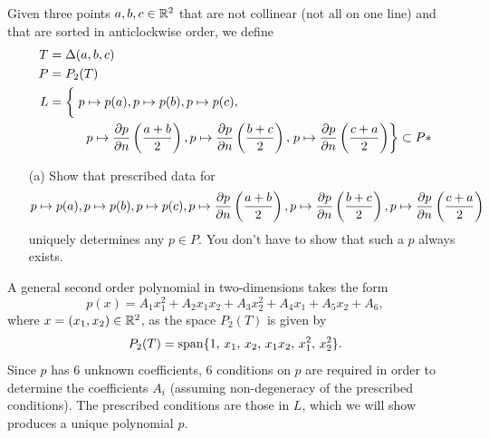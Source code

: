 




\begin{titlingpage}
	\titleGM
\end{titlingpage}
\clearpage
\setcounter{page}{1}

\begin{problem}{1}
Given three points $a,b,c \in \mathbb{R}^2$ that are not collinear (not all on one line) and that are sorted in anticlockwise order, we define
%
\begin{align*}
T &= \Delta (a,b,c) \\
P &= P_2(T) \\
L &= \left\{ \vphantom{\pd{p}{n}\left(\frac{a+b}{2}\right)} \right.
p \mapsto p(a),
p \mapsto p(b),
p \mapsto p(c), \\
&\qquad\quad
p \mapsto \pd{p}{n}\left(\frac{a+b}{2}\right),
p \mapsto \pd{p}{n}\left(\frac{b+c}{2}\right),
\left. p \mapsto \pd{p}{n}\left(\frac{c+a}{2}\right) \right\}
\subset P*
\end{align*}

\begin{center}
\end{center}

\begin{itemize}
	\item[(a)]  Show that prescribed data for
	$$p \mapsto p(a),
	p \mapsto p(b),
	p \mapsto p(c),
	p \mapsto \frac{\partial p}{\partial n}\left(\frac{a+b}{2}\right),
	p \mapsto \frac{\partial p}{\partial n}\left(\frac{b+c}{2}\right),
	p \mapsto \frac{\partial p}{\partial n}\left(\frac{c+a}{2}\right)$$
	uniquely determines any $p \in P$. You don't have to show that such a $p$ always exists.

\end{itemize}

\begin{solution}
A general second order polynomial in two-dimensions takes the form
\begin{equation}\label{QuadInterpPoly}
p(x) = A_1 x_1^2 + A_2 x_1x_2 + A_3 x_2^2 + A_4 x_1 + A_5 x_2 + A_6,
\end{equation}
where $x = (x_1,x_2) \in \mathbb{R}^2$, as the space $P_2(T)$ is given by
$$P_2(T) = \operatorname{span} \{ 1,\, x_1,\, x_2,\, x_1 x_2,\, x_1^2,\, x_2^2 \}.$$
Since $p$ has 6 unknown coefficients, 6 conditions on $p$ are required in order to determine the coefficients $A_i$ (assuming non-degeneracy of the prescribed conditions).
The prescribed conditions are those in $L$, which we will show produces a unique polynomial $p$.


\end{solution}
\end{problem}
